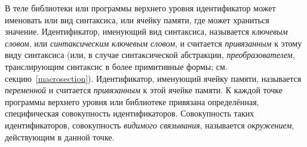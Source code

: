 В теле библиотеки или программы верхнего уровня идентификатор может именовать
или вид синтаксиса, или ячейку памяти, где может храниться
значение. Идентификатор, именующий вид синтаксиса, называется {\em ключевым
  словом}, или {\em синтаксическим ключевым словом}, и считается {\em привязанным} к этому виду синтаксиса (или, в случае
синтаксической абстракции, {\em преобразователем}, транслирующим синтаксис в более
примитивные формы; см. секцию~\ref{macrosection}). Идентификатор, именующий ячейку памяти,
называется {\em переменной} и считается {\em привязанным} к этой
ячейке памяти. К каждой точке программы верхнего уровня или библиотеке привязана определённая,
специфическая совокупность идентификаторов. Совокупность таких идентификаторов, совокупность
\textit{видимого связывания}, называется {\em окружением}, действующим в
данной точке.

